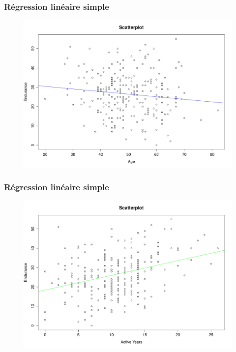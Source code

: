 \begin{frame}
\frametitle{Régression linéaire simple}
\begin{figure}[h]
\begin{center}
\includegraphics[width=0.9\textheight]{ScatterPlotEnduranceAge}
\end{center}
\end{figure}
\end{frame}

\begin{frame}
\frametitle{Régression linéaire simple}
\begin{figure}[h]
\begin{center}
\includegraphics[width=0.9\textheight]{ScatterPlotEnduranceActiveYears}
\end{center}
\end{figure}
\end{frame}


